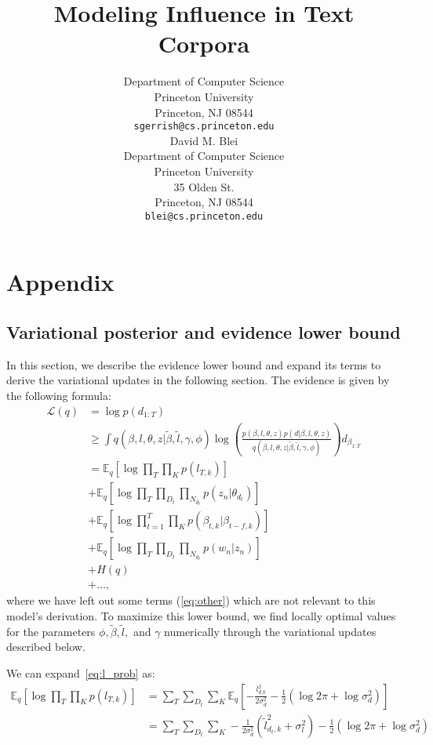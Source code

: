 \documentclass{article}
\title{Modeling Influence in Text Corpora}
\author{Department of Computer Science \\
Princeton University \\
Princeton, NJ 08544 \\
\texttt{sgerrish@cs.princeton.edu} \\
\And
David M. Blei \\
Department of Computer Science \\
Princeton University \\
35 Olden St. \\
Princeton, NJ 08544 \\
\texttt{blei@cs.princeton.edu} \\
}
\newcommand{\bv}{\tilde{\beta}}
\newcommand{\lv}{\tilde{l}}
\newcommand{\vlv}{{\sigma^2_{l}}}
\newcommand{\vd}{\sigma^2_{d}}
\newcommand{\expectq}[1]{\mathbb{E}_q\left[#1\right]}
\begin{document}
\section{Appendix}

\subsection{Variational posterior and evidence lower bound}
\label{section:variational_posterior}
In this section, we describe the evidence lower bound and expand its
terms to derive the variational updates in the following section.  The
evidence is given by the following formula:
\begin{align}
\label{eq:elbo}
\mathcal{L}(q) &= \log p(\textbf{$d_{1:T}$}) \\
            &\ge \int q( \beta, l, \theta, z | \bv, \lv, \gamma, \phi)
                    \log \left(\frac{p(\beta, l, \theta, z)
		                     p(d | \beta, l, \theta, z)}
			 {q( \beta, l, \theta, z | \bv, \lv, \gamma, \phi)}
                    \right)
		    d_{\beta_{1:T}} \\
            & = \expectq{ \log \prod_T \prod_K p(l_{T,k}) } \label{eq:l_prob} \\
            & + \expectq{ \log \prod_T \prod_{D_t} \prod_{N_{d_t}} p(z_n | \theta_{d_t}) } \label{eq:z_prob} \\
            & + \expectq{ \log \prod_{t=1}^T \prod_K p(\beta_{t,k}
                                 		      | \beta_{t-f,k}) }
    \label{eq:beta_prob} \\
            & + \expectq{ \log \prod_T \prod_{D_t} \prod_{N_{d_t}} p(w_n | z_n) } \label{eq:w_prob} \\
            & + H(q) \\
            & + \ldots \label{eq:other},
\end{align}
where we have left out some terms (\ref{eq:other}) which are not
relevant to this model's derivation.  To maximize this lower bound, we
find locally optimal values for the parameters $\phi, \bv, \lv,$ and
$\gamma$ numerically through the variational updates described below.

We can expand~\ref{eq:l_prob} as:
\begin{align}
  \expectq{ \log \prod_T \prod_K p(l_{T,k}) }
  & = \sum_T \sum_{D_t} \sum_K \expectq{-\frac{l_{d_,k}^2}{2 \vd} - \frac{1}{2} (\log 2 \pi + \log \vd) }  \\
  & = \sum_T \sum_{D_t} \sum_K -\frac{1}{2 \vd} (\lv_{d_t,k}^2 + \vlv) - \frac{1}{2} (\log 2 \pi + \log \vd) \\
\end{align}
\end{document}
